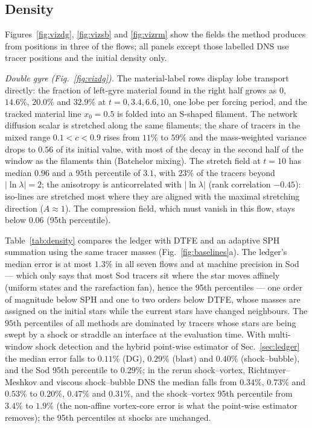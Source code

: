 \documentclass[11pt]{article}
\theoremstyle{definition}\newtheorem{definition}{Definition}\theoremstyle{remark}\newtheorem{remark}{Remark}
\begin{document}
\subsection{Density}
Figures~\ref{fig:vizdg}, \ref{fig:vizsb} and \ref{fig:vizrm} show the fields the method produces from positions in three of the flows; all panels except those labelled DNS use tracer positions and the initial density only.

\emph{Double gyre (Fig.~\ref{fig:vizdg}).} The material-label rows display lobe transport directly: the fraction of left-gyre material found in the right half grows as $0$, $14.6\%$, $20.0\%$ and $32.9\%$ at $t=0,3.4,6.6,10$, one lobe per forcing period, and the tracked material line $x_0=0.5$ is folded into an S-shaped filament. The network diffusion scalar is stretched along the same filaments; the share of tracers in the mixed range $0.1<c<0.9$ rises from $11\%$ to $59\%$ and the mass-weighted variance drops to $0.56$ of its initial value, with most of the decay in the second half of the window as the filaments thin (Batchelor mixing). The stretch field at $t=10$ has median $0.96$ and a $95$th percentile of $3.1$, with $23\%$ of the tracers beyond $|\ln\lambda|=2$; the anisotropy is anticorrelated with $|\ln\lambda|$ (rank correlation $-0.45$): iso-lines are stretched most where they are aligned with the maximal stretching direction ($A\approx1$). The compression field, which must vanish in this flow, stays below $0.06$ (95th percentile).

Table~\ref{tab:density} compares the ledger with DTFE and an adaptive SPH summation using the same tracer masses (Fig.~\ref{fig:baselines}a). The ledger's median error is at most $1.3\%$ in all seven flows and at machine precision in Sod --- which only says that most Sod tracers sit where the star moves affinely (uniform states and the rarefaction fan), hence the 95th percentiles --- one order of magnitude below SPH and one to two orders below DTFE, whose masses are assigned on the initial stars while the current stars have changed neighbours. The $95$th percentiles of all methods are dominated by tracers whose stars are being swept by a shock or straddle an interface at the evaluation time. With multi-window shock detection and the hybrid point-wise estimator of Sec.~\ref{sec:ledger} the median error falls to $0.11\%$ (DG), $0.29\%$ (blast) and $0.40\%$ (shock--bubble), and the Sod 95th percentile to $0.29\%$; in the rerun shock--vortex, Richtmyer--Meshkov and viscous shock--bubble DNS the median falls from $0.34\%$, $0.73\%$ and $0.53\%$ to $0.20\%$, $0.47\%$ and $0.31\%$, and the shock--vortex 95th percentile from $3.4\%$ to $1.9\%$ (the non-affine vortex-core error is what the point-wise estimator removes); the 95th percentiles at shocks are unchanged.
\end{document}
